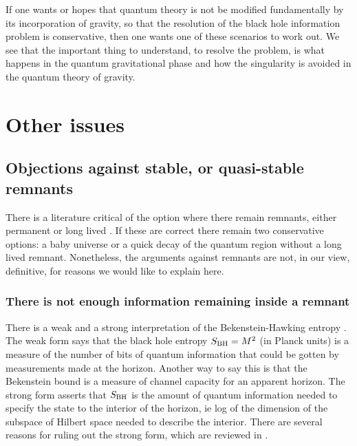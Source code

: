 \documentclass[12pt]{article}
\begin{document}
If one wants or hopes that quantum theory is not be modified fundamentally by its incorporation of gravity, so that the resolution of the black hole information problem is conservative, then one wants one of these scenarios to work out. We see that the important thing to understand, to resolve the problem,  is what happens in the quantum gravitational phase and how the singularity is avoided in the quantum theory of gravity.

\section{Other issues}
\label{issues}

\subsection{Objections against stable, or quasi-stable remnants}
\label{remnants}

There is a literature critical of the option where there remain remnants, either permanent or long lived \cite{Giddings:1993vj,Giddings:1993km,Susskind:1995da}. If these are correct there remain two conservative options:  
a baby universe or a quick decay of the quantum region without a long lived remnant.  Nonetheless,  the 
arguments against remnants are not, in our view, definitive, for reasons
we would like to explain here. 

\subsubsection*{There is not enough information remaining inside a remnant}

There is a weak and a strong interpretation of the Bekenstein-Hawking entropy \cite{weak, weakandstrong,Sorkin:1997ja,Jacobson:1999mi}.  The weak form says that the black hole entropy $S_{{\rm BH}}= M^2$ (in Planck units) is a measure of the number of bits of quantum information that could be gotten by measurements made at the horizon.  Another way to say this is that the Bekenstein
bound is a measure of channel capacity for an apparent horizon.  
The strong form 
asserts that $S_{{\rm BH}}$ is the amount of quantum information needed to specify the state to the interior of the horizon, ie log of the dimension of the subspace of Hilbert space needed to describe the interior.  There are several reasons for ruling out the strong form, which are reviewed
in \cite{weakandstrong}.  
\end{document}

